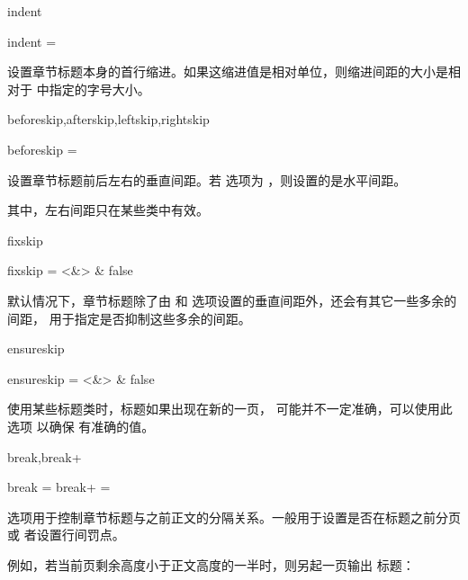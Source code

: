 \documentclass{cusdoc}
\begin{document}
\begin{keyval}[path=title/...]{indent}
  \begin{syntax}
    indent = 
  \end{syntax}
设置章节标题本身的首行缩进。如果这缩进值是相对单位，则缩进间距的大小是相对于 
中指定的字号大小。
\end{keyval}

\begin{keyval}[path=title/...]{beforeskip,afterskip,leftskip,rightskip}
  \begin{syntax}
    beforeskip = 
  \end{syntax}
设置章节标题前后左右的垂直间距。若  选项为 ，则设置的是水平间距。

其中，左右间距只在某些类中有效。
\end{keyval}

\begin{keyval}[path=title/...]{fixskip}
  \begin{syntax}
    fixskip = <&\TTF> & false 
  \end{syntax}
默认情况下，章节标题除了由  和  选项设置的垂直间距外，还会有其它一些多余的间距， 用于指定是否抑制这些多余的间距。
\end{keyval}

\begin{keyval}[path=title/...]{ensureskip}
  \begin{syntax}
    ensureskip = <&\TTF> & false 
  \end{syntax}
使用某些标题类时，标题如果出现在新的一页， 可能并不一定准确，可以使用此选项
以确保  有准确的值。
\end{keyval}

\begin{keyval}[path=title/...]{break,break+}
  \begin{syntax}
    break  = 
    break+ = 
  \end{syntax}
 选项用于控制章节标题与之前正文的分隔关系。一般用于设置是否在标题之前分页或
者设置行间罚点。
\end{keyval}

例如，若当前页剩余高度小于正文高度的一半时，则另起一页输出  标题：

\begin{xample}
\usepackage{needspace}
\stopxamplecode
\xamplecode
\medskip
\end{xample}
\end{document}
